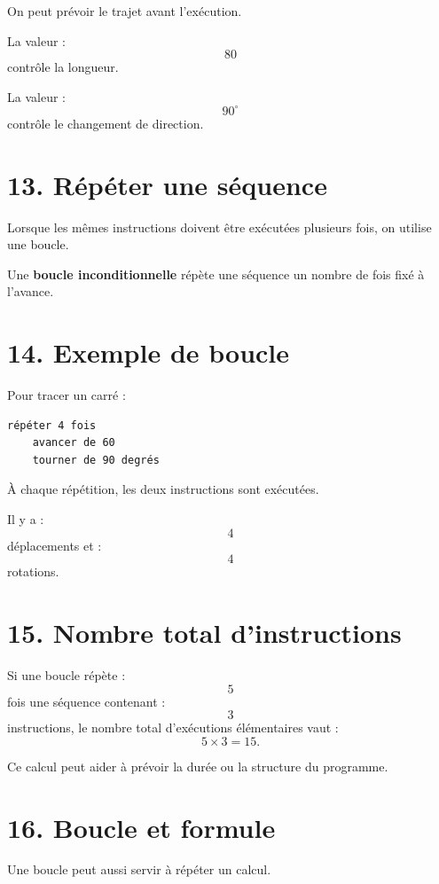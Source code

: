 On peut prévoir le trajet avant l'exécution.

La valeur :
\[
80
\]
contrôle la longueur.

La valeur :
\[
90^\circ
\]
contrôle le changement de direction.

\section{13. Répéter une séquence}

Lorsque les mêmes instructions doivent être exécutées plusieurs fois, on utilise une boucle.


\begin{definition}
Une \textbf{boucle inconditionnelle} répète une séquence un nombre de fois fixé à l'avance.
\end{definition}

\section{14. Exemple de boucle}

Pour tracer un carré :
\begin{verbatim}
répéter 4 fois
    avancer de 60
    tourner de 90 degrés
\end{verbatim}

À chaque répétition, les deux instructions sont exécutées.

Il y a :
\[
4
\]
déplacements et :
\[
4
\]
rotations.

\section{15. Nombre total d'instructions}

Si une boucle répète :
\[
5
\]
fois une séquence contenant :
\[
3
\]
instructions, le nombre total d'exécutions élémentaires vaut :
\[
5\times3=15.
\]

Ce calcul peut aider à prévoir la durée ou la structure du programme.

\section{16. Boucle et formule}

Une boucle peut aussi servir à répéter un calcul.

